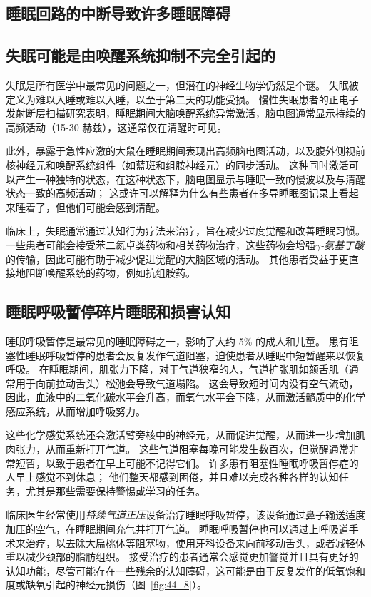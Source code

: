 \subsection{睡眠回路的中断导致许多睡眠障碍}

\subsection{失眠可能是由唤醒系统抑制不完全引起的}

失眠是所有医学中最常见的问题之一，但潜在的神经生物学仍然是个谜。
失眠被定义为难以入睡或难以入睡，以至于第二天的功能受损。
慢性失眠患者的正电子发射断层扫描研究表明，睡眠期间大脑唤醒系统异常激活，脑电图通常显示持续的高频活动（15-30 赫兹），这通常仅在清醒时可见。


此外，暴露于急性应激的大鼠在睡眠期间表现出高频脑电图活动，以及腹外侧视前核神经元和唤醒系统组件（如蓝斑和组胺神经元）的同步活动。
这种同时激活可以产生一种独特的状态，在这种状态下，脑电图显示与睡眠一致的慢波以及与清醒状态一致的高频活动；
这或许可以解释为什么有些患者在多导睡眠图记录上看起来睡着了，但他们可能会感到清醒。


临床上，失眠通常通过认知行为疗法来治疗，旨在减少过度觉醒和改善睡眠习惯。
一些患者可能会接受苯二氮卓类药物和相关药物治疗，这些药物会增强\textit{$\gamma$-氨基丁酸}的传输，因此可能有助于减少促进觉醒的大脑区域的活动。
其他患者受益于更直接地阻断唤醒系统的药物，例如抗组胺药。



\subsection{睡眠呼吸暂停碎片睡眠和损害认知}

睡眠呼吸暂停是最常见的睡眠障碍之一，影响了大约 5\% 的成人和儿童。
患有阻塞性睡眠呼吸暂停的患者会反复发作气道阻塞，迫使患者从睡眠中短暂醒来以恢复呼吸。
在睡眠期间，肌张力下降，对于气道狭窄的人，气道扩张肌如颏舌肌（通常用于向前拉动舌头）松弛会导致气道塌陷。
这会导致短时间内没有空气流动，因此，血液中的二氧化碳水平会升高，而氧气水平会下降，从而激活髓质中的化学感应系统，从而增加呼吸努力。


这些化学感觉系统还会激活臂旁核中的神经元，从而促进觉醒，从而进一步增加肌肉张力，从而重新打开气道。
这些气道阻塞每晚可能发生数百次，但觉醒通常非常短暂，以致于患者在早上可能不记得它们。
许多患有阻塞性睡眠呼吸暂停症的人早上感觉不到休息；
他们整天都感到困倦，并且难以完成各种各样的认知任务，尤其是那些需要保持警惕或学习的任务。


临床医生经常使用\textit{持续气道正压}设备治疗睡眠呼吸暂停，该设备通过鼻子输送适度加压的空气，在睡眠期间充气并打开气道。
睡眠呼吸暂停也可以通过上呼吸道手术来治疗，以去除大扁桃体等阻塞物，使用牙科设备来向前移动舌头，或者减轻体重以减少颈部的脂肪组织。
接受治疗的患者通常会感觉更加警觉并且具有更好的认知功能，尽管可能存在一些残余的认知障碍，这可能是由于反复发作的低氧饱和度或缺氧引起的神经元损伤（图~\ref{fig:44_8}）。


